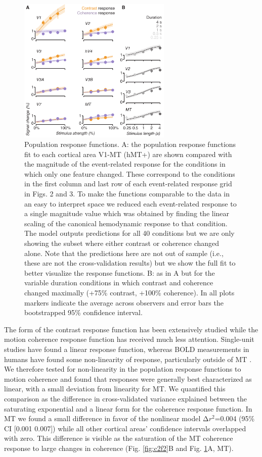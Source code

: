 \begin{figure}
\centering
\includegraphics[keepaspectratio,width=0.65\textwidth]{figs_c2/Fig5_fit.pdf}
\caption[Population response functions.]{Population response functions. A: the population response functions fit to each cortical area V1-MT (hMT+) are shown compared with the magnitude of the event-related response for the conditions in which only one feature changed. These correspond to the conditions in the first column and last row of each event-related response grid in Figs. 2 and 3. To make the functions comparable to the data in an easy to interpret space we reduced each event-related response to a single magnitude value which was obtained by finding the linear scaling of the canonical hemodynamic response to that condition. The model outputs predictions for all 40 conditions but we are only showing the subset where either contrast or coherence changed alone. Note that the predictions here are not out of sample (i.e., these are not the cross-validation results) but we show the full fit to better visualize the response functions. B: as in A but for the variable duration conditions in which contrast and coherence changed maximally (+75\% contrast, +100\% coherence). In all plots markers indicate the average across observers and error bars the bootstrapped 95\% confidence interval.}
\label{fig:c2f5}
\end{figure}


The form of the contrast response function has been extensively studied \citep{Albrecht1982-rq,Boynton1999-jd,Sclar1990-lk} while the motion coherence response function has received much less attention. Single-unit studies have found a linear response function, whereas BOLD measurements in humans have found some non-linearity of response, particularly outside of MT \citep{Rees2000-ul}. We therefore tested for non-linearity in the population response functions to motion coherence and found that responses were generally best characterized as linear, with a small deviation from linearity for MT. We quantified this comparison as the difference in cross-validated variance explained between the saturating exponential and a linear form for the coherence response function. In MT we found a small difference in favor of the nonlinear model Δ$r^2$=0.004 (95\% CI [0.001 0.007]) while all other cortical areas’ confidence intervals overlapped with zero. This difference is visible as the saturation of the MT coherence response to large changes in coherence (Fig. \ref{fig:c2f2}B and Fig. \ref{fig:c2f5}A, MT).

